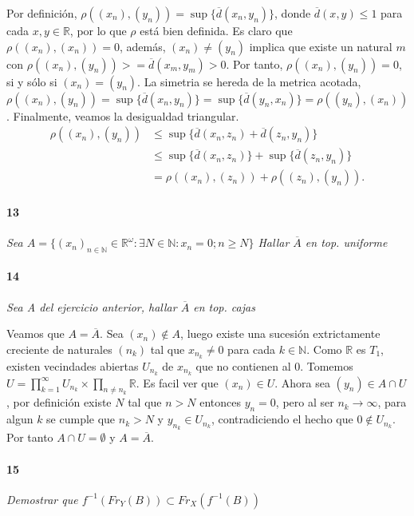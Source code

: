 \documentclass[12pt]{article}
\begin{document}
Por definición, $\rho((x_n),(y_n))=\sup{\{\overline{d}(x_n,y_n)\}}$, donde $\overline{d}(x,y) \leq 1$ para cada $x,y \in \mathbb{R}$, por lo que $\rho$ está bien definida.
Es claro que $\rho((x_n),(x_n))=0$, además, $(x_n) \neq (y_n)$ implica que existe un natural $m$ con $\rho((x_n),(y_n))>=\overline{d}(x_m,y_m)>0$. Por tanto, $\rho((x_n),(y_n))=0$, si y sólo si $(x_n)=(y_n)$.
La simetria se hereda de la metrica acotada, $\rho((x_n),(y_n))=\sup{\{\overline{d}(x_n,y_n)\}}=\sup{\{\overline{d}(y_n,x_n)\}}=\rho((y_n),(x_n))$. Finalmente, veamos la desigualdad triangular.
\begin{align*}
    \rho((x_n),(y_n)) &\leq \sup{\{\overline{d}(x_n,z_n)+\overline{d}(z_n,y_n)\}} \\
                      &\leq \sup{\{\overline{d}(x_n,z_n)\}}+\sup{\{\overline{d}(z_n,y_n)\}}\\
                      &=\rho((x_n),(z_n))+\rho((z_n),(y_n)).
\end{align*}
\paragraph{13}
\textit{Sea $A=\{(x_n)_{n\in\mathbb{N}}\in\mathbb{R}^\omega : \exists N\in\mathbb{N}: x_n =0 ; n \geq N \}$
Hallar $\overline{A}$ en top. uniforme}

\paragraph{14}
\textit{Sea A del ejercicio anterior, hallar $\overline{A}$ en top. cajas}

Veamos que $A=\overline{A}$. Sea $(x_n) \notin A$, luego existe una sucesión extrictamente creciente de naturales $(n_k)$ tal que $x_{n_k} \neq 0$ para cada $k \in \mathbb{N}$. Como $\mathbb{R}$ es $T_1$, existen vecindades abiertas $U_{n_k}$ de $x_{n_k}$ que no contienen al $0$.
Tomemos $U=\prod_{k=1}^{\infty}U_{n_k} \times \prod_{n \neq n_k} \mathbb{R}$. Es facil ver que $(x_n) \in U$. Ahora sea $(y_n) \in A \cap U$, por definición existe $N$ tal que $n>N$ entonces $y_n=0$, pero al ser $n_k \to \infty$, para algun $k$ se cumple que
$n_k>N$ y $y_{n_k} \in U_{n_k}$, contradiciendo el hecho que $0 \notin U_{n_k}$. Por tanto $A \cap U = \emptyset$ y $A=\overline{A}$.
\paragraph{15}
\textit{Demostrar que $f^{-1}(Fr_Y(B))\subset Fr_X(f^{-1}(B))$}
\end{document}
